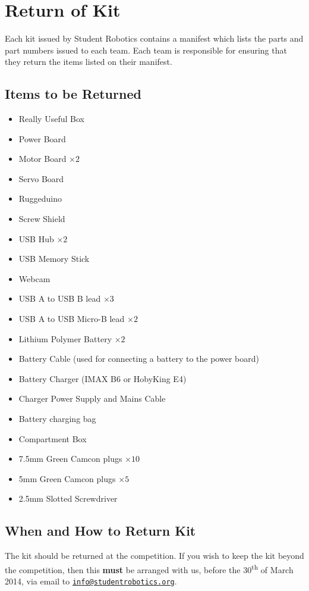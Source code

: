 \section {Return of Kit}
\label{sec:kit-return}

Each kit issued by Student Robotics contains a manifest which lists the parts and part numbers issued to each team.
Each team is responsible for ensuring that they return the items listed on their manifest.

\subsection {Items to be Returned}

\begin{itemize}
 \setlength{\itemsep}{0.3em}
 \item Really Useful Box

 \item Power Board
 \item Motor Board $\times 2$
 \item Servo Board
 \item Ruggeduino
 \item Screw Shield

 \item USB Hub $\times 2$
 \item USB Memory Stick
 \item Webcam
 \item USB A to USB B lead $\times 3$
 \item USB A to USB Micro-B lead $\times 2$

 \item Lithium Polymer Battery $\times 2$
 \item Battery Cable (used for connecting a battery to the power board)
 \item Battery Charger (IMAX B6 or HobyKing E4)
 \item Charger Power Supply and Mains Cable
 \item Battery charging bag

 \item Compartment Box
 \item 7.5mm Green Camcon plugs $\times 10$
 \item 5mm Green Camcon plugs $\times 5$
 \item 2.5mm Slotted Screwdriver
\end{itemize}

\subsection {When and How to Return Kit}

The kit should be returned at the competition.
If you wish to keep the kit beyond the competition, then this \textbf{must} be arranged with us,
 before the 30\textsuperscript{th} of March 2014, via email to \href{mailto:info@studentrobotics.org}{\nolinkurl{info@studentrobotics.org}}.
